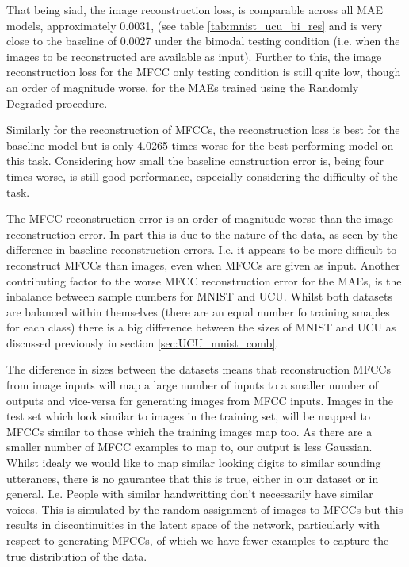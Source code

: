 That being siad, the image reconstruction loss, is comparable across all MAE models, approximately 0.0031, (see table \ref{tab:mnist_ucu_bi_res} and is very close to the baseline of 0.0027 under the bimodal testing condition (i.e. when the images to be reconstructed are available as input). Further to this, the image reconstruction loss for the MFCC only testing condition is still quite low, though an order of magnitude worse, for the MAEs trained using the Randomly Degraded procedure.

Similarly for the reconstruction of MFCCs, the reconstruction loss is best for the baseline model but is only 4.0265 times worse for the best performing model on this task. Considering how small the baseline construction error is, being four times worse, is still good performance, especially considering the difficulty of the task.

The MFCC reconstruction error is an order of magnitude worse than the image reconstruction error. In part this is due to the nature of the data, as seen by the difference in baseline reconstruction errors. I.e. it appears to be more difficult to reconstruct MFCCs than images, even when MFCCs are given as input.
Another contributing factor to the worse MFCC reconstruction error for the MAEs, is the inbalance between sample numbers for MNIST and UCU. Whilst both datasets are balanced within themselves (there are an equal number fo training smaples for each class) there is a big difference between the sizes of MNIST and UCU as discussed previously in section \ref{sec:UCU_mnist_comb}. 

The difference in sizes between the datasets means that reconstruction MFCCs from image inputs will map a large number of inputs to a smaller number of outputs and vice-versa for generating images from MFCC inputs. Images in the test set which look similar to images in the training set, will be mapped to MFCCs similar to those which the training images map too. As there are a smaller number of MFCC examples to map to, our output is less Gaussian. Whilst idealy we would like to map similar looking digits to similar sounding utterances, there is no gaurantee that this is true, either in our dataset or in general. I.e. People with similar handwritting don't necessarily have similar voices. This is simulated by the random assignment of images to MFCCs but this results in discontinuities in the latent space of the network, particularly with respect to generating MFCCs, of which we have fewer examples to capture the true distribution of the data.

